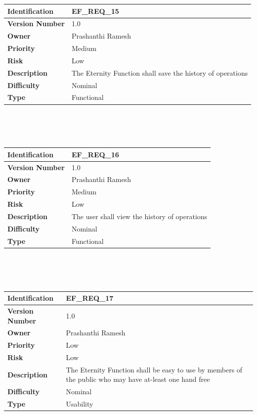 \documentclass[11pt, english]{report}
\begin{document}
\setlength{\tabcolsep}{18pt}
\renewcommand{\arraystretch}{1.5}
\begin{tabular}{ |p{2.2cm}|p{9.8cm}| }
\hline
\textbf{Identification} &  EF\_REQ\_15 \\ \hline 
\textbf{Version Number} & 1.0 \\ \hline 
\textbf{Owner} & Prashanthi Ramesh  \\ \hline
\textbf{Priority} & Medium  \\ \hline
\textbf{Risk} & Low  \\ \hline
\textbf{Description} & The Eternity Function shall save the history of operations \\ \hline
\textbf{Difficulty} & Nominal  \\ \hline
\textbf{Type} & Functional \\ 
\hline
\end{tabular} \\ \\ \\ 

\setlength{\tabcolsep}{18pt}
\renewcommand{\arraystretch}{1.5}
\begin{tabular}{ |p{2.2cm}|p{9.8cm}| }
\hline
\textbf{Identification} &  EF\_REQ\_16 \\ \hline 
\textbf{Version Number} & 1.0 \\ \hline 
\textbf{Owner} & Prashanthi Ramesh  \\ \hline
\textbf{Priority} & Medium  \\ \hline
\textbf{Risk} & Low  \\ \hline
\textbf{Description} & The user shall view the history of operations \\ \hline
\textbf{Difficulty} & Nominal  \\ \hline
\textbf{Type} & Functional \\ 
\hline
\end{tabular} \\ \\ \\ 

\setlength{\tabcolsep}{18pt}
\renewcommand{\arraystretch}{1.5}
\begin{tabular}{ |p{2.2cm}|p{9.8cm}| }
\hline
\textbf{Identification} &  EF\_REQ\_17 \\ \hline 
\textbf{Version Number} & 1.0 \\ \hline 
\textbf{Owner} & Prashanthi Ramesh  \\ \hline
\textbf{Priority} & Low  \\ \hline
\textbf{Risk} & Low  \\ \hline
\textbf{Description} & The Eternity Function shall be easy to use by members of the public who may have at-least one hand free\\ \hline
\textbf{Difficulty} & Nominal  \\ \hline
\textbf{Type} & Usability \\
\hline
\end{tabular} \\ \\ \\ 
\end{document}
